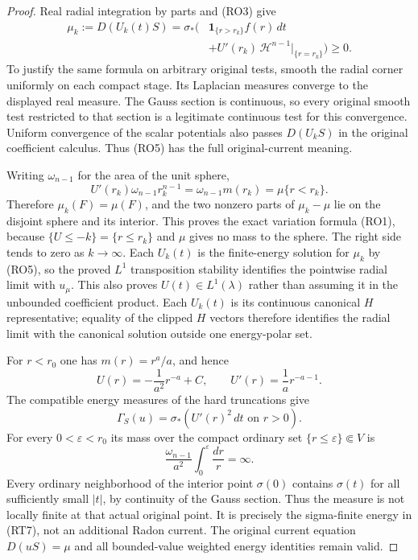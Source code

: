 \documentclass[11pt,a4paper]{article}
\numberwithin{equation}{section}
\theoremstyle{definition}
\theoremstyle{remark}
\begin{document}
\begin{proof}
Real radial integration by parts and (RO3) give
\[
 \begin{split}
 \mu_k:=D(U_k(t)S)
 =\sigma_*\bigl(&\mathbf1_{\{r>r_k\}}f(r)\,dt\\
          &+U'(r_k)\,\mathcal H^{n-1}|_{\{r=r_k\}}\bigr)\ge0.
 \end{split}
 \tag{RO5}
\]
To justify the same formula on arbitrary original tests, smooth
the radial corner uniformly on each compact stage.  Its
Laplacian measures converge to the displayed real measure.
The Gauss section is continuous, so every original smooth test
restricted to that section is a legitimate continuous test for
this convergence.  Uniform convergence of the scalar potentials
also passes $D(U_kS)$ in the original coefficient calculus.
Thus (RO5) has the full original-current meaning.

Writing $\omega_{n-1}$ for the area of the unit sphere,
\[
 U'(r_k)\omega_{n-1}r_k^{n-1}
       =\omega_{n-1}m(r_k)=\mu\{r<r_k\}.
 \tag{RO6}
\]
Therefore $\mu_k(F)=\mu(F)$, and the two nonzero parts of
$\mu_k-\mu$ lie on the disjoint sphere and its interior.
This proves the exact variation formula (RO1), because
$\{U\le-k\}=\{r\le r_k\}$ and $\mu$ gives no mass to the sphere.
The right side tends to zero as $k\to\infty$.
Each $U_k(t)$ is the finite-energy solution for $\mu_k$ by
(RO5), so the proved $L^1$ transposition stability identifies
the pointwise radial limit with $u_\mu$.  This also proves
$U(t)\in L^1(\lambda)$ rather than assuming it in the
unbounded coefficient product.  Each $U_k(t)$ is its continuous
canonical $H$ representative; equality of the clipped $H$ vectors
therefore identifies the radial limit with the canonical solution
outside one energy-polar set.

For $r<r_0$ one has $m(r)=r^a/a$, and hence
\[
            U(r)=-\frac{1}{a^2}r^{-a}+C,
                   \qquad U'(r)=\frac1a r^{-a-1}.
 \tag{RO7}
\]
The compatible energy measures of the hard truncations give
\[
 \Gamma_S(u)=\sigma_*(U'(r)^2\,dt\text{ on }r>0).
\]
For every $0<\varepsilon<r_0$ its mass over the compact
ordinary set $\{r\le\varepsilon\}\Subset V$ is
\[
        \frac{\omega_{n-1}}{a^2}
                    \int_0^\varepsilon\frac{dr}{r}=\infty.
 \tag{RO8}
\]
Every ordinary neighborhood of the interior point $\sigma(0)$
contains $\sigma(t)$ for all sufficiently small $|t|$, by
continuity of the Gauss section.  Thus the measure is not
locally finite at that actual original point.  It is precisely
the sigma-finite energy in (RT7), not an additional Radon
current.  The original current equation $D(uS)=\mu$ and all
bounded-value weighted energy identities remain valid.
\end{proof}
\end{document}
